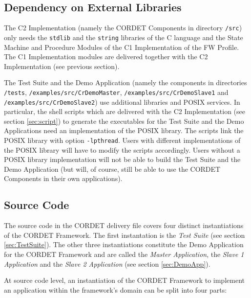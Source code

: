 \documentclass[a4paper,10pt]{article}
\begin{document}
\subsection{Dependency on External Libraries}
The C2 Implementation (namely the CORDET Components in directory \texttt{/src}) only needs the \texttt{stdlib} and the \texttt{string} libraries of the C language and the State Machine and Procedure Modules of the C1 Implementation of the FW Profile. The C1 Implementation modules are delivered together with the C2 Implementation (see previous section). 

The Test Suite and the Demo Application (namely the components in directories \texttt{/tests}, \texttt{/examples/src/CrDemoMaster}, \texttt{/examples/src/CrDemoSlave1} and \texttt{/examples/src/CrDemoSlave2}) use additional libraries and POSIX services. In particular, the shell scripts which are delivered with the C2 Implementation (see section \ref{sec:script}) to generate the executables for the Test Suite and the Demo Applications need an implementation of the POSIX library. The scripts link the POSIX library with option \texttt{-lpthread}. Users with different implementations of the POSIX library will have to modify the scripts accordingly. Users without a POSIX library implementation will not be able to build the Test Suite and the Demo Application (but will, of course, still be able to use the CORDET Components in their own applications).

\subsection{Source Code}\label{sec:fwSrcCode}

The source code in the CORDET delivery file covers four distinct instantiations of the CORDET Framework. The first instantation is the \textit{Test Suite} (see section \ref{sec:TestSuite}). The other three instantiations constitute the Demo Application for the CORDET Framework and are called the \textit{Master Application}, the \textit{Slave 1 Application} and the \textit{Slave 2 Application} (see section \ref{sec:DemoApp}).

At source code level, an instantiation of the CORDET Framework to implement an application within the framework's domain can be split into four parts:
\end{document}
